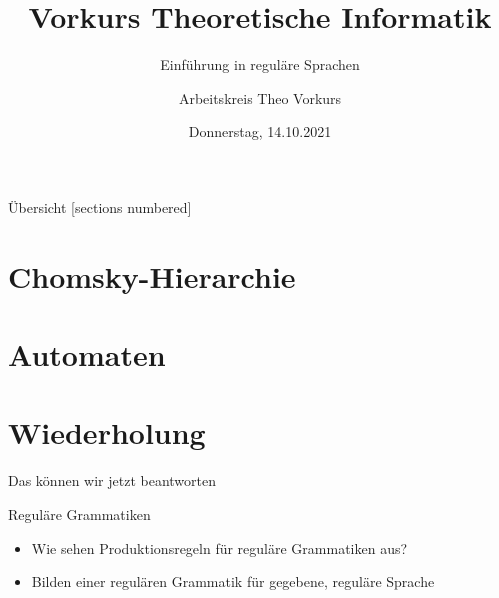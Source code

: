 

\title{Vorkurs Theoretische Informatik}
\subtitle{Einführung in reguläre Sprachen}
\date{Donnerstag, 14.10.2021}
\author{Arbeitskreis Theo Vorkurs}



\maketitle

\begin{frame}[fragile]{Übersicht}
  [sections numbered]
  \tableofcontents%
\end{frame}

\section{Chomsky-Hierarchie}




\section{Automaten}








\section{Wiederholung}

\begin{frame}[fragile]{Das können wir jetzt beantworten}
  \begin{alertblock}{Reguläre Grammatiken}
    \begin{itemize}
      \item Wie sehen Produktionsregeln für reguläre Grammatiken aus?
      \item Bilden einer regulären Grammatik für gegebene, reguläre Sprache
    \end{itemize}
  \end{alertblock}
\end{frame}

